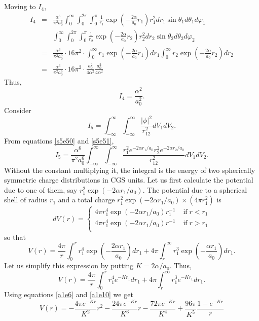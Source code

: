 \documentclass{article}
\numberwithin{equation}{section}
\begin{document}
Moving to $I_4$,
\begin{eqnarray*}
I_4 &=& \frac{\alpha^6}{\pi^2 a_0^6}
\int_0^\infty\int_0^{2\pi}\int_0^\pi
\frac{1}{r_1}\exp\left(-\frac{2\alpha}{a_0}r_1\right)
r_1^2dr_1\sin\theta_1d\theta_1d\varphi_1 \\
 & & 
\int_0^\infty\int_0^{2\pi}\int_0^\pi
\frac{1}{r_2}\exp\left(-\frac{2\alpha}{a_0}r_2\right)
r_2^2dr_2\sin\theta_2d\theta_2d\varphi_2 \\
&=& \frac{\alpha^6}{\pi^2 a_0^6} \cdot 16\pi^2 \cdot
\int_0^\infty r_1\exp\left(-\frac{2\alpha}{a_0}r_1\right)dr_1
\int_0^\infty r_2\exp\left(-\frac{2\alpha}{a_0}r_2\right)dr_2 \\
&=& \frac{\alpha^6}{\pi^2 a_0^6} \cdot 16\pi^2 \cdot
\frac{a_0^2}{4\alpha^2}\frac{a_0^2}{4\alpha^2}
\end{eqnarray*}
Thus,
\begin{equation}\label{s5e76}
I_4 = \frac{\alpha^2}{a_0^2}.
\end{equation}
Consider
\[
I_5 = \int_{-\infty}^\infty\int_{-\infty}^\infty \frac{|\phi|^2}{r_{12}^2}
dV_1 dV_2.
\]
From equations \eqref{s5e50} and \eqref{s5e51},
\[
I_5 = \frac{\alpha^6}{\pi^2 a_0^6}
\int_{-\infty}^\infty\int_{-\infty}^\infty
\frac{r_1^2e^{-2\alpha r_1/a_0}r_2^2e^{-2\alpha r_2/a_0}}{r_{12}^2}
dV_1 dV_2.
\]
Without the constant multiplying it, the integral is the energy of two
spherically symmetric charge distributions in CGS units. Let us first
calculate the potential due to one of them, say 
$r_1^2\exp(-2\alpha r_1/a_0)$. The potential due to a spherical shell of 
radius $r_1$ and a total charge $r_1^2\exp(-2\alpha r_1/a_0)\times 
(4\pi r_1^2)$ is
\begin{equation}\label{s5e77}
dV(r) = \begin{cases}
4\pi r_1^4\exp(-2\alpha r_1/a_0) r_1^{-1} & \;\text{if}\; r < r_1 \\
4\pi r_1^4\exp(-2\alpha r_1/a_0) r^{-1} & \;\text{if}\; r > r_1 \\
\end{cases}
\end{equation}
so that
\[
V(r) = \frac{4\pi}{r}\int_0^r r_1^4\exp\left(-\frac{2\alpha r_1}{a_0}
       \right)dr_1 + 4\pi\int_r^\infty r_1^3\exp\left(-\frac{\alpha r_1}
       {a_0}\right)dr_1.
\]
Let us simplify this expression by putting $K = 2\alpha/a_0$. Thus,
\[
V(r) = \frac{4\pi}{r}\int_0^r r_1^4e^{-Kr_1}dr_1 + 
       4\pi\int_r^\infty r_1^3 e^{-Kr_1}dr_1.
\]
Using equations \eqref{a1e6} and \eqref{a1e10} we get
\begin{equation}\label{s5e78}
V(r) = -\frac{4\pi e^{-Kr}}{K^2}r^2 - \frac{24\pi e^{-Kr}}{K^3}r - 
       \frac{72\pi e^{-Kr}}{K^4} + \frac{96\pi}{K^5}\frac{1 - e^{-Kr}}{r}
\end{equation}
\end{document}
